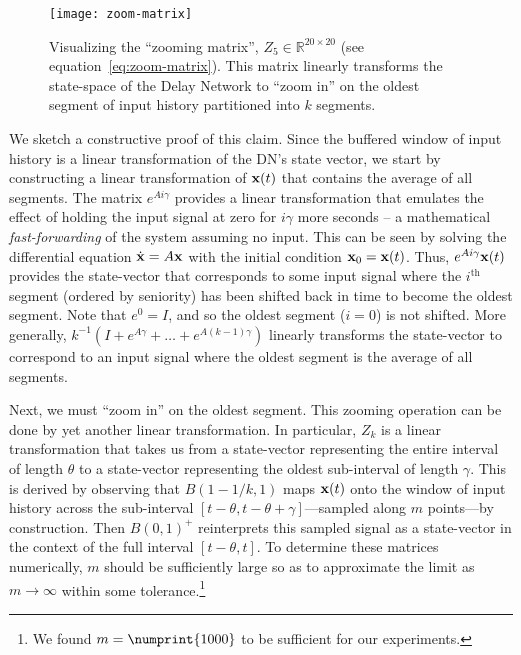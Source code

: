 \begin{figure}
  \centering
  \texttt{[image: zoom-matrix]}
  \caption{\label{fig:zoom-matrix}
    Visualizing the ``zooming matrix'', $Z_5 \in \mathbb{R}^{20 \times 20}$ (see equation~\ref{eq:zoom-matrix}).
   This matrix linearly transforms the state-space of the Delay Network to ``zoom in'' on the oldest segment of input history partitioned into $k$ segments.
  }
\end{figure}

We sketch a constructive proof of this claim.
Since the buffered window of input history is a linear transformation of the DN's state vector, we start by constructing a linear transformation of $\mathbf{x}(t)$ that contains the average of all segments. 
The matrix $e^{A i \gamma}$ provides a linear transformation that emulates the effect of holding the input signal at zero for $i \gamma$ more seconds -- a mathematical \emph{fast-forwarding} of the system assuming no input.
This can be seen by solving the differential equation $\dot{\mathbf{x}} = A \mathbf{x}$ with the initial condition $\mathbf{x}_0 = \mathbf{x}(t)$.
Thus, $e^{A i \gamma} \mathbf{x}(t)$ provides the state-vector that corresponds to some input signal where the $i^\text{th}$ segment (ordered by seniority) has been shifted back in time to become the oldest segment. 
Note that $e^0 = I$, and so the oldest segment ($i=0$) is not shifted.
More generally, $k^{-1} \left( I + e^{A \gamma} + \ldots + e^{A (k-1) \gamma} \right)$ linearly transforms the state-vector to correspond to an input signal where the oldest segment is the average of all segments.

Next, we must ``zoom in'' on the oldest segment.  
This zooming operation can be done by yet another linear transformation.
In particular, $Z_k$ is a linear transformation that takes us from a state-vector representing the entire interval of length $\theta$ to a state-vector representing the oldest sub-interval of length $\gamma$.
This is derived by observing that $B(1 - 1/k, 1)$ maps $\mathbf{x}(t)$ onto the window of input history across the sub-interval $[t - \theta, t - \theta + \gamma]$---sampled along $m$ points---by construction.
Then $B(0, 1)^+$ reinterprets this sampled signal as a state-vector in the context of the full interval $[t - \theta, t]$.
To determine these matrices numerically, $m$ should be sufficiently large so as to approximate the limit as $m \rightarrow \infty$ within some tolerance.\footnote{%
We found $m = \numprint{1000}$ to be sufficient for our experiments.}

